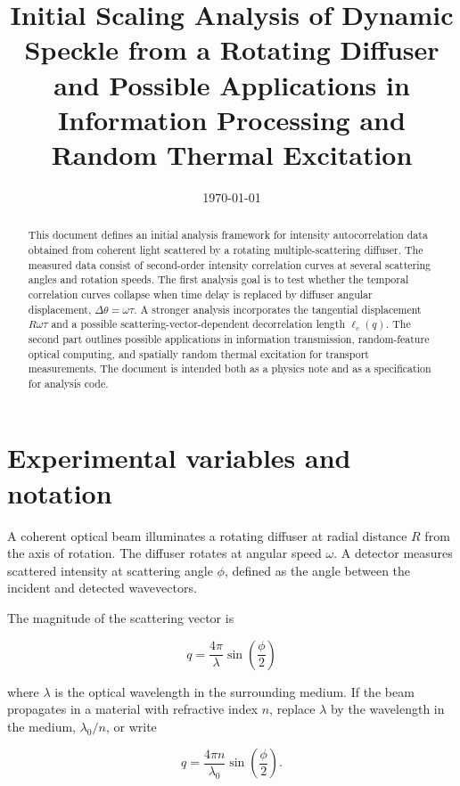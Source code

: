 \documentclass[11pt,letterpaper]{article}
\title{Initial Scaling Analysis of Dynamic Speckle from a Rotating Diffuser\\
and Possible Applications in Information Processing and Random Thermal Excitation}
\author{}
\date{\today}
\begin{document}
\maketitle

\begin{abstract}
This document defines an initial analysis framework for intensity
autocorrelation data obtained from coherent light scattered by a rotating
multiple-scattering diffuser. The measured data consist of second-order
intensity correlation curves at several scattering angles and rotation
speeds. The first analysis goal is to test whether the temporal correlation
curves collapse when time delay is replaced by diffuser angular displacement,
$\Delta\theta=\omega\tau$. A stronger analysis incorporates the tangential
displacement $R\omega\tau$ and a possible scattering-vector-dependent
decorrelation length $\ell_c(q)$. The second part outlines possible
applications in information transmission, random-feature optical computing,
and spatially random thermal excitation for transport measurements. The
document is intended both as a physics note and as a specification for
analysis code.
\end{abstract}

\tableofcontents

\section{Experimental variables and notation}

A coherent optical beam illuminates a rotating diffuser at radial distance
$R$ from the axis of rotation. The diffuser rotates at angular speed
$\omega$. A detector measures scattered intensity at scattering angle
$\phi$, defined as the angle between the incident and detected wavevectors.

The magnitude of the scattering vector is

\begin{equation}
    \boxed{
    q = \frac{4\pi}{\lambda}\sin\left(\frac{\phi}{2}\right)
    }
    \label{eq:q_definition}
\end{equation}

where $\lambda$ is the optical wavelength in the surrounding medium. If the
beam propagates in a material with refractive index $n$, replace $\lambda$
by the wavelength in the medium, $\lambda_0/n$, or write

\begin{equation}
    q = \frac{4\pi n}{\lambda_0}
    \sin\left(\frac{\phi}{2}\right).
\end{equation}
\end{document}

